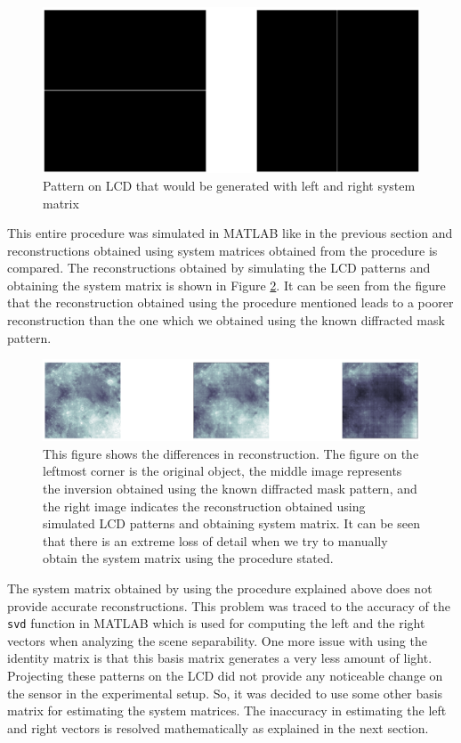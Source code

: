 \begin{figure}[h]
\centering
\includegraphics[width = \linewidth]{pics/identity_left_right.png}
\caption{Pattern on LCD that would be generated with left and right system matrix}
\label{fig:pattern_identity}
\end{figure}
This entire procedure was simulated in MATLAB like in the previous section and reconstructions obtained using system matrices obtained from the procedure is compared. The reconstructions obtained by simulating the LCD patterns and obtaining the system matrix is shown in Figure \ref{fig:rec_id}. It can be seen from the figure that the reconstruction obtained using the procedure mentioned leads to a poorer reconstruction than the one which we obtained using the known diffracted mask pattern.
\begin{figure}[h]
\centering
\includegraphics[width = \linewidth]{pics/id_reconst.png}
\caption{This figure shows the differences in reconstruction. The figure on the leftmost corner is the original object, the middle image represents the inversion obtained using the known diffracted mask pattern, and the right image indicates the reconstruction obtained using simulated LCD patterns and obtaining system matrix. It can be seen that there is an extreme loss of detail when we try to manually obtain the system matrix using the procedure stated.}
\label{fig:rec_id}
\end{figure}
The system matrix obtained by using the procedure explained above does not provide accurate reconstructions. This problem was traced to the accuracy of the \texttt{svd} function in MATLAB which is used for computing the left and the right vectors when analyzing the scene separability. One more issue with using the identity matrix is that this basis matrix generates a very less amount of light. Projecting these patterns on the LCD did not provide any noticeable change on the sensor in the experimental setup. So, it was decided to use some other basis matrix for estimating the system matrices. The inaccuracy in estimating the left and right vectors is resolved mathematically as explained in the next section. 
